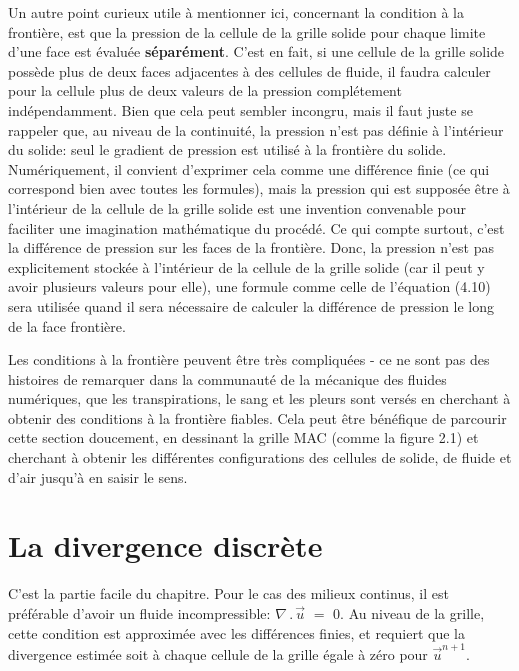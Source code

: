 \documentclass[11pt]{report}
\begin{document}
Un autre point curieux utile à mentionner ici, concernant la condition à la frontière, est que la pression de la cellule de la grille solide pour chaque limite d'une face est évaluée \textbf{séparément}. C'est en fait, si une cellule de la grille solide possède plus de deux faces adjacentes à des cellules de fluide, il faudra calculer pour la cellule plus de deux valeurs de la pression complétement indépendamment. Bien que cela peut sembler incongru, mais il faut juste se rappeler que, au niveau de la continuité, la pression n'est pas définie à l'intérieur du solide: seul le gradient de pression est utilisé à la frontière du solide. Numériquement, il convient d'exprimer cela comme une différence finie (ce qui correspond bien avec toutes les formules), mais la pression qui est supposée être à l'intérieur de la cellule de la grille solide  est une invention convenable pour faciliter une imagination mathématique du procédé. Ce qui compte surtout, c'est la différence de pression sur les faces de la frontière. Donc, la pression n'est pas explicitement stockée à l'intérieur de la cellule de la grille solide (car il peut y avoir plusieurs valeurs pour elle), une formule comme celle de l'équation (4.10) sera utilisée quand il sera nécessaire de calculer la différence de pression le long de la face frontière. \newline

Les conditions à la frontière peuvent être très compliquées - ce ne sont pas des histoires de remarquer dans la communauté de la mécanique des fluides numériques, que les transpirations, le sang et les pleurs sont versés en cherchant à obtenir des conditions à la frontière fiables. Cela peut être bénéfique de parcourir cette section doucement, en dessinant la grille MAC (comme la figure 2.1) et cherchant à obtenir les différentes configurations des cellules de solide, de fluide et d'air jusqu'à en saisir le sens. 

\section{La divergence discrète}

C'est la partie facile du chapitre. Pour le cas des milieux continus, il est préférable d'avoir un fluide incompressible: $ \nabla \,.\, \overrightarrow{u} \,\, = \,\, 0 $. Au niveau de la grille, cette condition est approximée avec les différences finies, et requiert que la divergence estimée soit à chaque cellule de la grille égale à zéro pour $\overrightarrow{u}^{n+1}$.
\end{document}
